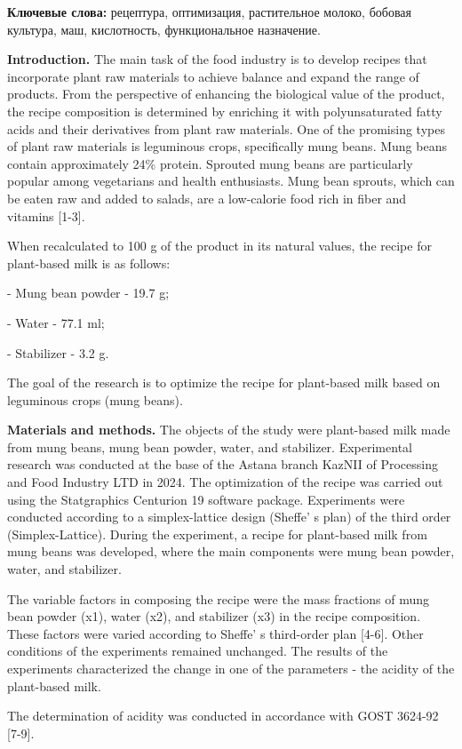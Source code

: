 {\bfseries Ключевые слова:} рецептура, оптимизация, растительное молоко,
бобовая культура, маш, кислотность, функциональное назначение.

{\bfseries Introduction.} The main task of the food industry is to develop
recipes that incorporate plant raw materials to achieve balance and
expand the range of products. From the perspective of enhancing the
biological value of the product, the recipe composition is determined by
enriching it with polyunsaturated fatty acids and their derivatives from
plant raw materials. One of the promising types of plant raw materials
is leguminous crops, specifically mung beans. Mung beans contain
approximately 24\% protein. Sprouted mung beans are particularly popular
among vegetarians and health enthusiasts. Mung bean sprouts, which can
be eaten raw and added to salads, are a low-calorie food rich in fiber
and vitamins {[}1-3{]}.

When recalculated to 100 g of the product in its natural values, the
recipe for plant-based milk is as follows:

- Mung bean powder - 19.7 g;

- Water - 77.1 ml;

- Stabilizer - 3.2 g.

The goal of the research is to optimize the recipe for plant-based milk
based on leguminous crops (mung beans).

{\bfseries Materials and methods.} The objects of the study were
plant-based milk made from mung beans, mung bean powder, water, and
stabilizer. Experimental research was conducted at the base of the
Astana branch KazNII of Processing and Food Industry LTD in 2024. The
optimization of the recipe was carried out using the Statgraphics
Centurion 19 software package. Experiments were conducted according to a
simplex-lattice design (Sheffe' s plan) of the third
order (Simplex-Lattice). During the experiment, a recipe for plant-based
milk from mung beans was developed, where the main components were mung
bean powder, water, and stabilizer.

The variable factors in composing the recipe were the mass fractions of
mung bean powder (x1), water (x2), and stabilizer (x3) in the recipe
composition. These factors were varied according to
Sheffe' s third-order plan {[}4-6{]}. Other conditions of
the experiments remained unchanged. The results of the experiments
characterized the change in one of the parameters - the acidity of the
plant-based milk.

The determination of acidity was conducted in accordance with GOST
3624-92 {[}7-9{]}.

